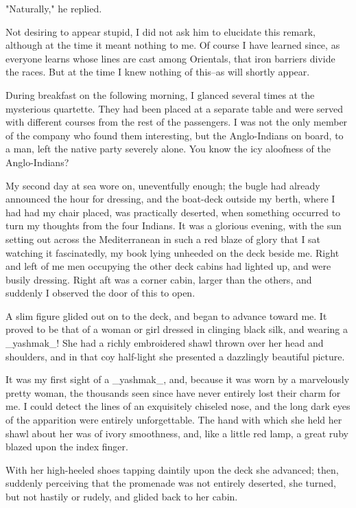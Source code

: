 "Naturally," he replied.

Not desiring to appear stupid, I did not ask him to elucidate this
remark, although at the time it meant nothing to me. Of course I have
learned since, as everyone learns whose lines are cast among
Orientals, that iron barriers divide the races. But at the time I knew
nothing of this--as will shortly appear.

During breakfast on the following morning, I glanced several times at
the mysterious quartette. They had been placed at a separate table and
were served with different courses from the rest of the passengers. I
was not the only member of the company who found them interesting, but
the Anglo-Indians on board, to a man, left the native party severely
alone. You know the icy aloofness of the Anglo-Indians?

My second day at sea wore on, uneventfully enough; the bugle had
already announced the hour for dressing, and the boat-deck outside
my berth, where I had had my chair placed, was practically deserted,
when something occurred to turn my thoughts from the four Indians.
It was a glorious evening, with the sun setting out across the
Mediterranean in such a red blaze of glory that I sat watching it
fascinatedly, my book lying unheeded on the deck beside me. Right
and left of me men occupying the other deck cabins had lighted up,
and were busily dressing. Right aft was a corner cabin, larger than
the others, and suddenly I observed the door of this to open.

A slim figure glided out on to the deck, and began to advance toward
me. It proved to be that of a woman or girl dressed in clinging black
silk, and wearing a _yashmak_! She had a richly embroidered shawl
thrown over her head and shoulders, and in that coy half-light she
presented a dazzlingly beautiful picture.

It was my first sight of a _yashmak_, and, because it was worn by a
marvelously pretty woman, the thousands seen since have never entirely
lost their charm for me. I could detect the lines of an exquisitely
chiseled nose, and the long dark eyes of the apparition were entirely
unforgettable. The hand with which she held her shawl about her was of
ivory smoothness, and, like a little red lamp, a great ruby blazed
upon the index finger.

With her high-heeled shoes tapping daintily upon the deck she
advanced; then, suddenly perceiving that the promenade was not
entirely deserted, she turned, but not hastily or rudely, and glided
back to her cabin.

